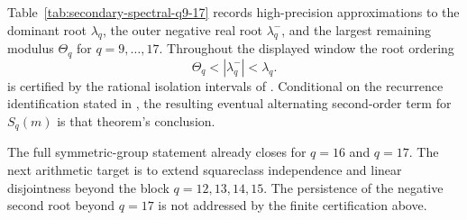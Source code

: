 \begin{remark}
\label{rem:secondary-spectral-pattern}
Table~\ref{tab:secondary-spectral-q9-17} records high-precision approximations
to the dominant root \(\lambda_q\), the outer negative real root
\(\lambda_q^-\), and the largest remaining modulus \(\Theta_q\) for
\(q=9,\dots,17\).  Throughout the displayed window the root ordering
\[
  \Theta_q<|\lambda_q^-|<\lambda_q.
\]
is certified by the rational isolation intervals of
.  Conditional on the recurrence
identification stated in , the resulting
eventual alternating second-order term for \(S_q(m)\) is that theorem's
conclusion.
\end{remark}

\begin{remark}
\label{rem:q16q17}
The full symmetric-group statement already closes for \(q=16\) and \(q=17\).
The next arithmetic target is to extend squareclass independence and linear
disjointness beyond the block \(q=12,13,14,15\).  The persistence of the
negative second root beyond \(q=17\) is not addressed by the finite
certification above.
\end{remark}
